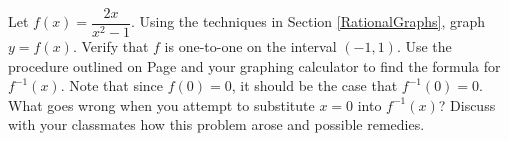 {Let $f(x) = \dfrac{2x}{x^2-1}$.  Using the techniques in Section \ref{RationalGraphs}, graph $y=f(x)$.  Verify that $f$ is one-to-one on the interval $(-1,1)$.  Use the procedure outlined on Page \pageref{inverseprocedure} and your graphing calculator to find the formula for $f^{-1}(x)$.  Note that since $f(0) = 0$, it should be the case that $f^{-1}(0) = 0$.  What goes wrong when you attempt to substitute $x=0$ into $f^{-1}(x)$?  Discuss with your classmates how this problem arose and possible remedies.}
{}